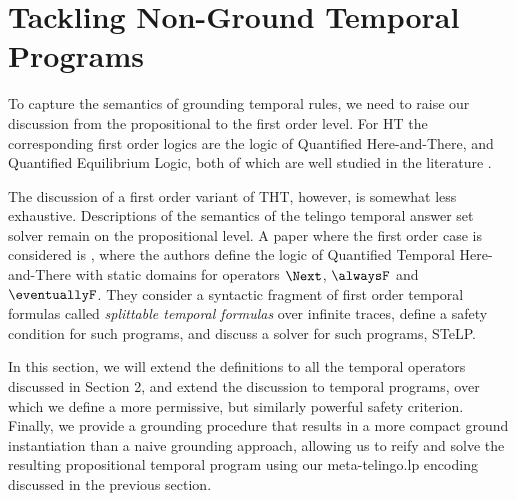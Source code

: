 \section{Tackling Non-Ground Temporal Programs}

To capture the semantics of grounding temporal rules, we need to raise
our discussion from the propositional to the first order level. For HT
the corresponding first order logics are the logic of Quantified
Here-and-There, and Quantified Equilibrium Logic, both of which are
well studied in the literature \cite{peaval06a} \cite{peaval08a}.

The discussion of a first order variant of THT, however, is somewhat
less exhaustive. Descriptions of the semantics of the telingo temporal
answer set solver remain on the propositional level. A paper where the
first order case is considered is \cite{agcapevidi17a}, where the
authors define the logic of Quantified Temporal Here-and-There with
static domains for operators $\Next$, $\alwaysF$ and
$\eventuallyF$. They consider a syntactic fragment of first order
temporal formulas called \emph{splittable temporal formulas} over
infinite traces, define a safety condition for such programs, and
discuss a solver for such programs, STeLP. 

In this section, we will extend the definitions to all the temporal
operators discussed in Section 2, and extend the discussion to
temporal programs, over which we define a more permissive, but
similarly powerful safety criterion. Finally, we provide a grounding
procedure that results in a more compact ground instantiation than a
naive grounding approach, allowing us to reify and solve the resulting
propositional temporal program using our meta-telingo.lp encoding
discussed in the previous section.




